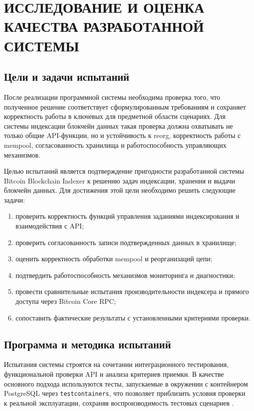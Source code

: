 ﻿\section{ИССЛЕДОВАНИЕ И ОЦЕНКА КАЧЕСТВА РАЗРАБОТАННОЙ СИСТЕМЫ}

\subsection{Цели и задачи испытаний}

После реализации программной системы необходима проверка того, что полученное
решение соответствует сформулированным требованиям и сохраняет корректность
работы в ключевых для предметной области сценариях. Для системы индексации
блокчейн данных такая проверка должна охватывать не только общие API-функции, но
и устойчивость к reorg, корректность работы с mempool, согласованность
хранилища и работоспособность управляющих механизмов.

Целью испытаний является подтверждение пригодности разработанной системы
Bitcoin Blockchain Indexer к решению задач индексации, хранения и
выдачи блокчейн данных. Для достижения этой цели
необходимо решить следующие задачи:
\begin{enumerate}
    \item проверить корректность функций управления заданиями индексирования и взаимодействия с API;
    \item проверить согласованность записи подтвержденных данных в хранилище;
    \item оценить корректность обработки mempool и реорганизаций цепи;
    \item подтвердить работоспособность механизмов мониторинга и диагностики;
    \item провести сравнительные испытания производительности индексера
    и прямого доступа через Bitcoin Core RPC;
    \item сопоставить фактические результаты с установленными критериями проверки.
\end{enumerate}

\subsection{Программа и методика испытаний}

Испытания системы строятся на сочетании интеграционного тестирования,
функциональной проверки API и анализа критериев приемки. В качестве
основного подхода используются тесты, запускаемые в окружении с контейнером
PostgreSQL через \texttt{testcontainers}, что позволяет приблизить условия
проверки к реальной эксплуатации, сохраняя воспроизводимость тестовых
сценариев \cite{testcontainers_docs}.

